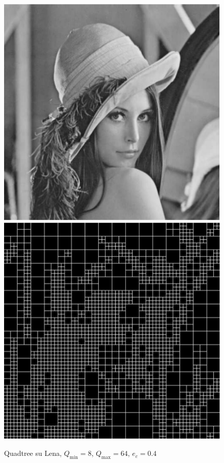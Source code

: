 \documentclass[11pt,a4paper,appendixprefix=true,numbers=noenddot]{scrreprt}
\begin{document}
\begin{figure}[!ht]
\centering
\includegraphics[scale=0.5]{images/lena.pdf} 
\includegraphics[scale=0.5]{images/quadlena.pdf} 
\caption{Quadtree su Lena, $Q_{\text{min}} = 8$, $Q_{\text{max}} = 64$, $e_c = 0.4$}
\end{figure}
\end{document}
